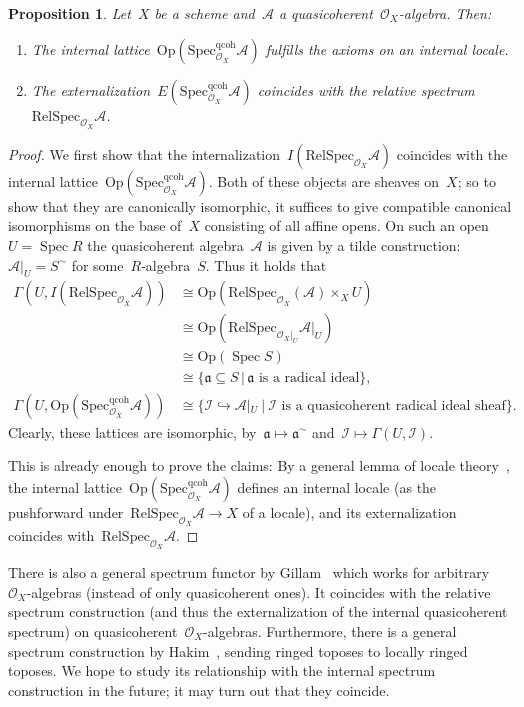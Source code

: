 \documentclass[10pt]{amsart}
\theoremstyle{definition}
\theoremstyle{plain}
\newtheorem{prop}[defn]{Proposition}
\theoremstyle{remark}
\newcommand{\A}{\mathcal{A}}
\renewcommand{\O}{\mathcal{O}}
\newcommand{\I}{\mathcal{I}}
\newcommand{\aaa}{\mathfrak{a}}
\DeclareMathOperator{\Spec}{Spec}
\newcommand{\QcohSpec}[2]{\mathrm{Spec}^{\mathrm{qcoh}}_{#1}{#2}}
\newcommand{\RelSpec}[2]{\mathrm{RelSpec}_{#1}{#2}}
\newcommand{\Open}{\mathrm{Op}}
\newcommand{\?}{\,{:}\,}
\renewcommand{\_}{\mathpunct{.}\,}
\begin{document}
\begin{prop}Let~$X$ be a scheme and~$\A$ a quasicoherent~$\O_X$-algebra. Then:
\begin{enumerate}
\item The internal lattice~$\Open(\QcohSpec{\O_X}{\A})$ fulfills the axioms on an
internal locale.
\item The externalization~$E(\QcohSpec{\O_X}{\A})$ coincides with the relative
spectrum~$\RelSpec{\O_X}{\A}$.
\end{enumerate}
\end{prop}
\begin{proof}We first show that the internalization~$I(\RelSpec{\O_X}{\A})$
coincides with the internal lattice~$\Open(\QcohSpec{\O_X}{\A})$. Both of these
objects are sheaves on~$X$; so to show that they are canonically isomorphic, it
suffices to give compatible canonical isomorphisms on the base of~$X$
consisting of all affine opens. On such an open~$U = \Spec R$ the
quasicoherent algebra~$\A$ is given by a tilde construction:~$\A|_U =
S^{\sim}$ for some~$R$-algebra~$S$. Thus it holds that
\begin{align*}
  \Gamma(U, I(\RelSpec{\O_X}{\A})) &\cong
  \Open(\RelSpec{\O_X}{(\A)} \times_X U) \\
  & \cong
  \Open(\RelSpec{\O_X|_U}{\A|_U}) \\
  & \cong
  \Open(\Spec S) \\
  & \cong
  \{ \aaa \subseteq S \,|\, \text{$\aaa$ is a radical ideal} \}, \\
  \Gamma(U, \Open(\QcohSpec{\O_X}{\A})) &\cong
  \{ \I \hookrightarrow \A|_U \ |\ \text{$\I$ is a quasicoherent radical ideal sheaf} \}.
\end{align*}
Clearly, these lattices are isomorphic, by~$\aaa \mapsto \aaa^\sim$ and~$\I
\mapsto \Gamma(U,\I)$.

This is already enough to prove the claims: By a general lemma of locale
theory~\cite[discussion before proposition~C1.6.1]{johnstone:elephant},
the internal lattice~$\Open(\QcohSpec{\O_X}{\A})$ defines an internal locale
(as the pushforward under~$\RelSpec{\O_X}{\A} \to X$ of a locale), and its
externalization coincides with~$\RelSpec{\O_X}{\A}$.
\end{proof}

There is also a general spectrum functor by Gillam~\cite{gillam:localization}
which works for arbitrary~$\O_X$-algebras (instead of only quasicoherent
ones). It coincides with the relative spectrum construction (and thus the
externalization of the internal quasicoherent spectrum) on
quasicoherent~$\O_X$-algebras. Furthermore, there is a general spectrum
construction by Hakim~\cite{hakim:relative-schemes}, sending ringed toposes to
locally ringed toposes. We hope to study its relationship with the internal
spectrum construction in the future; it may turn out that they coincide.
\end{document}
